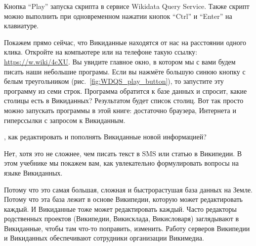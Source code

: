 \begin{marginfigure}[0.0cm]
{
\setlength{\fboxsep}{0pt}%
\setlength{\fboxrule}{1pt}%
}
\caption[Выполнение скрипта в сервисе Wikidata Query Service.]{Кнопка ``Play'' запуска скрипта в сервисе Wikidata Query Service. Также скрипт можно выполнить при одновременном нажатии кнопок ``Ctrl'' и ``Enter'' на клавиатуре.}%
\label{fig:WDQS_play_button}%
\end{marginfigure}%
Покажем прямо сейчас, что Викиданные находятся от нас на расстоянии одного клика.
Откройте на компьютере или на телефоне такую ссылку: 
\url{https://w.wiki/4cXU}. 
Вы увидите главное окно, в котором мы с вами будем писать наши небольшие програмы. 
Если вы нажмёте большую синюю кнопку с белым треугольником (рис.~\ref{fig:WDQS_play_button}), 
то запустите эту программу из семи строк. 
Программа обратится к базе данных 
и спросит, какие столицы есть в Викиданных?
Результатом будет список столиц. %
Вот так просто можно запускать программы в этой книге: достаточно браузера, 
Интернета и гиперссылки с запросом к Викиданным.


, 
как редактировать и пополнять Викиданные новой информацией? 

Нет, хотя это не сложнее, чем писать текст в SMS 
или статью в Википедии. В этом учебнике мы покажем вам, 
как увлекательно формулировать вопросы на языке Викиданных. 



Потому что это самая большая, сложная 
и быстрорастушая база данных на Земле. 
Потому что эта база лежит в основе Википедии, которую может редактировать каждый.
И Викиданные тоже может редактировать каждый. 
Часто редакторы родственных проектов (Википедии, Викисклада, Викисловаря) 
заглядывают в Викиданные, чтобы там что-то поправить, изменить. 
Работу серверов Википедии и Викиданных обеспечивают сотрудники организации Викимедиа. 





